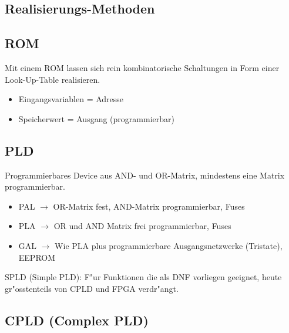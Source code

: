 \begin{scriptsize}

\begin{multicols}{2}
\section{Realisierungs-Methoden}
\subsection{ROM}
Mit einem ROM lassen sich rein kombinatorische Schaltungen in Form einer Look-Up-Table realisieren.
\vspace{-\topsep}
\begin{itemize}
	\setlength{\itemsep}{1pt}
 	\setlength{\parskip}{0pt}
  	\setlength{\parsep}{0pt}
	\item Eingangsvariablen = Adresse
	\item Speicherwert = Ausgang (programmierbar)
\end{itemize}
\vspace{-\topsep}

\subsection{PLD}
Programmierbares Device aus AND- und OR-Matrix, mindestens eine Matrix programmierbar.
\vspace{-\topsep}
\begin{itemize}
	\setlength{\itemsep}{1pt}
	\setlength{\parskip}{0pt}
	\setlength{\parsep}{0pt}
	
	\item PAL $\rightarrow$ OR-Matrix fest, AND-Matrix programmierbar, Fuses
	\item PLA $\rightarrow$ OR und AND Matrix frei programmierbar, Fuses
	\item GAL $\rightarrow$ Wie PLA plus programmierbare Ausgangsnetzwerke (Tristate), EEPROM
\end{itemize}
\vspace{-\topsep}
SPLD (Simple PLD): F"ur Funktionen die als DNF vorliegen geeignet, heute gr"osstenteils von CPLD und FPGA verdr"angt.

\subsection{CPLD (Complex PLD)}
\begin{itemize}
	\setlength{\itemsep}{1pt}
	\setlength{\parskip}{0pt}
	\setlength{\parsep}{0pt}
	

\end{itemize}
\end{multicols}
\end{scriptsize}
